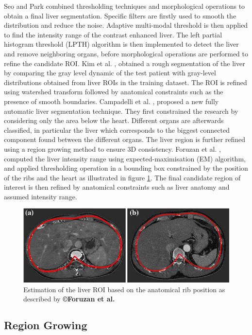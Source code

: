 Seo and Park \cite{Seo2005} 
combined thresholding techniques and morphological operations to obtain
a final liver segmentation. Specific filters are firstly used to smooth the
distribution and reduce the noise. Adaptive multi-modal threshold is
then applied to find the intensity range of the contrast enhanced liver.
The left partial histogram threshold (LPTH) algorithm is then
implemented to detect the liver and remove neighboring organs, before
morphological operations are performed to refine the candidate ROI.
Kim et al. \cite{Kim2007}, obtained a rough segmentation of the liver by comparing the gray
level dynamic of the test patient with gray-level distributions obtained
from liver ROIs in the training dataset. The ROI is refined using
watershed transform followed by anatomical constraints such as the
presence of smooth boundaries.
Campadelli et al. \cite{Campadelli2009}, proposed a new fully automatic liver segmentation
technique. They first constrained the research by considering only the
area below the heart. Different organs are afterwards classified, in
particular the liver which corresponds to the biggest connected
component found between the different organs. The liver region is
further refined using a region growing method to ensure 3D consistency.
Foruzan et al. \cite{Foruzan2009}, computed the liver intensity range using
expected-maximisation (EM) algorithm, and applied thresholding operation
in a bounding box constrained by the position of the ribs and the heart
as illustrated in figure \ref{ForuzanFig3}. The final candidate region of interest is then
refined by anatomical constraints such as liver anatomy and assumed
intensity range.

\begin{figure} [ht!]
	\centering
	\includegraphics[width=0.7\linewidth]{images/Foruzan2009_Fig3}
	\caption{Estimation of the liver ROI based on the anatomical rib position as described by \textbf{©Foruzan et al. \cite{Foruzan2009}}}
	\label{ForuzanFig3}
\end{figure}


\subsection{Region Growing}

